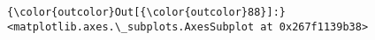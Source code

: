 \documentclass[11pt]{article}
\begin{document}
            \begin{Verbatim}[commandchars=\\\{\}]
{\color{outcolor}Out[{\color{outcolor}88}]:} <matplotlib.axes.\_subplots.AxesSubplot at 0x267f1139b38>
\end{Verbatim}
        
    \begin{center}
    \end{center}
    { \hspace*{\fill} \\}
    
    \begin{center}
    \end{center}
    { \hspace*{\fill} \\}
    
\end{document}
